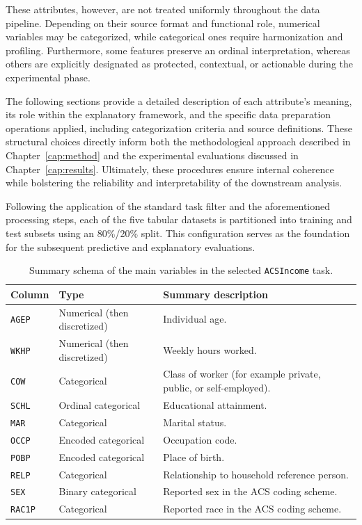 These attributes, however, are not treated uniformly throughout the data pipeline. Depending on their source format and functional role, numerical variables may be categorized, while categorical ones require harmonization and profiling. Furthermore, some features preserve an ordinal interpretation, whereas others are explicitly designated as protected, contextual, or actionable during the experimental phase. 

The following sections provide a detailed description of each attribute's meaning, its role within the explanatory framework, and the specific data preparation operations applied, including categorization criteria and source definitions. These structural choices directly inform both the methodological approach described in Chapter~\ref{cap:method} and the experimental evaluations discussed in Chapter~\ref{cap:results}. Ultimately, these procedures ensure internal coherence while bolstering the reliability and interpretability of the downstream analysis.

Following the application of the standard task filter and the aforementioned processing steps, each of the five tabular datasets is partitioned into training and test subsets using an 80\%/20\% split. This configuration serves as the foundation for the subsequent predictive and explanatory evaluations.

\begin{table}[htbp]
\centering
\renewcommand{\arraystretch}{1.2}
\caption{Summary schema of the main variables in the selected \texttt{ACSIncome} task.}
\label{tab:acsincome-feature-schema}
\begin{tabular}{>{\raggedright\arraybackslash}p{} p{} p{}}
  \toprule
  \textbf{Column} & \textbf{Type} & \textbf{Summary description} \\
  \midrule
  \texttt{AGEP}  & Numerical (then discretized) & Individual age. \\
  \texttt{WKHP}  & Numerical (then discretized) & Weekly hours worked. \\
  \texttt{COW}   & Categorical & Class of worker (for example private, public, or self-employed). \\
  \texttt{SCHL}  & Ordinal categorical & Educational attainment. \\
  \texttt{MAR}   & Categorical & Marital status. \\
  \texttt{OCCP}  & Encoded categorical & Occupation code. \\
  \texttt{POBP}  & Encoded categorical & Place of birth. \\
  \texttt{RELP}  & Categorical & Relationship to household reference person. \\
  \texttt{SEX}   & Binary categorical & Reported sex in the ACS coding scheme. \\
  \texttt{RAC1P} & Categorical & Reported race in the ACS coding scheme. \\
  \bottomrule
\end{tabular}
\renewcommand{\arraystretch}{1.0}
\end{table}

